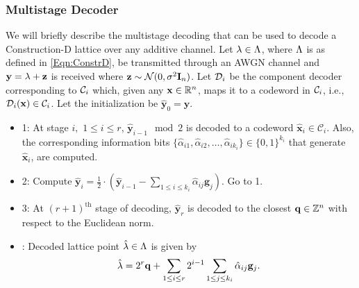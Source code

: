 \subsubsection*{Multistage Decoder}
We will briefly describe the multistage decoding that can be used to decode a Construction-D lattice over any additive channel. Let $\lambda\in\Lambda$, where $\Lambda$ is as defined in \eqref{Eqn:ConstrD}, be transmitted through an AWGN channel and $\mathbf{y}=\lambda+\mathbf{z}$ is received where $\mathbf{z}\sim\mathcal{N}(0,\sigma^{2} \mathbf{I}_{n})$. Let $\mathcal{D}_{i}$ be the component decoder corresponding to $\mathcal{C}_{i}$ which, given any $\mathbf{x}\in\mathbb{R}^{n}$, maps it to a codeword in $\mathcal{C}_{i}$, i.e., $\mathcal{D}_{i}(\mathbf{x})\in\mathcal{C}_{i}$. Let the initialization be $\hat{\mathbf{y}}_{0}=\mathbf{y}$.
\begin{itemize}
\item {} 1: At stage $i, $ $1\leq i\leq r$, $\hat{\mathbf{y}}_{i-1}\mod 2$ is decoded to a codeword  $\hat{\mathbf{x}}_{i}\in \mathcal{C}_{i}$. Also, the corresponding information bits  $\{\hat{\alpha}_{i1},\hat{\alpha}_{i2},\ldots, \hat{\alpha}_{ik_{i}}\}\in \{0,1\}^{k_{i}}$ that generate $\hat{\mathbf{x}}_{i}$, are computed.
\item {} 2: Compute $\hat{\mathbf{y}}_{i}= \frac{1}{2} \cdot(\hat{\mathbf{y}}_{i-1}-\sum_{1\leq i\leq k_{i}}\hat{\alpha}_{ij}\mathbf{g}_j)$. Go to  1.
\item {} 3: At $(r+1)^{\text{th}}$ stage of decoding, $\hat{\mathbf{y}}_{r}$ is decoded to the closest $\mathbf{q}\in\mathbb{Z}^{n}$ with respect to the Euclidean norm.
\item {}: Decoded lattice point $\hat{\mathbf{\lambda}}\in\Lambda$ is given by
\begin{align}
    \hat{\mathbf{\lambda}}=2^{r}\mathbf{q}+\sum_{1\leq i\leq r}2^{i-1}\sum_{1\leq j\leq k_{i}}\hat{\alpha}_{ij}\mathbf{g}_{j}.
\end{align}

\end{itemize}

